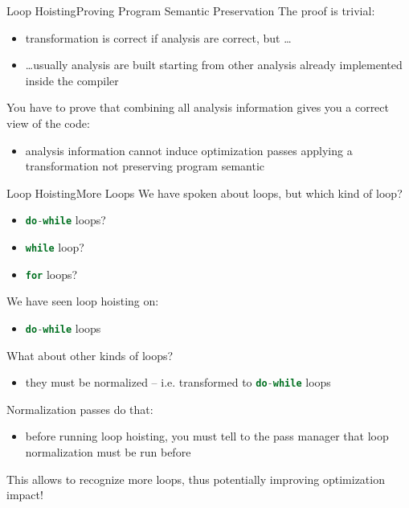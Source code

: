 \documentclass[10pt,mathserif]{beamer}
\newcommand{\cinline}[1]{\lstinline[language=C]!#1!}
\begin{document}
\begin{frame}{Loop Hoisting}{Proving Program Semantic Preservation}
The \alert{proof} is trivial:

\begin{itemize}
\item transformation is correct if analysis are correct, but \ldots
\item \ldots usually analysis are built starting from other analysis already
      implemented inside the compiler
\end{itemize}

\vfill
You have to prove that combining all analysis information gives you a
correct view of the code:

\begin{itemize}
\item analysis information cannot induce optimization passes applying a
      transformation not preserving program semantic
\end{itemize}
\end{frame}

\begin{frame}{Loop Hoisting}{More Loops}
We have spoken about loops, but which kind of loop?

\begin{itemize}
\item \cinline{do-while} loops?
\item \cinline{while} loop?
\item \cinline{for} loops?
\end{itemize}

We have seen loop hoisting on:

\begin{itemize}
\item \cinline{do-while} loops
\end{itemize}

What about other kinds of loops?

\begin{itemize}
\item they must be normalized -- i.e. transformed to \cinline{do-while} loops
\end{itemize}

\alert{Normalization passes} do that:

\begin{itemize}
\item before running loop hoisting, you must tell to the pass manager that loop
      normalization must be run before
\end{itemize}

This allows to recognize more loops, thus potentially
\alert{improving optimization impact}!
\end{frame}
\end{document}
